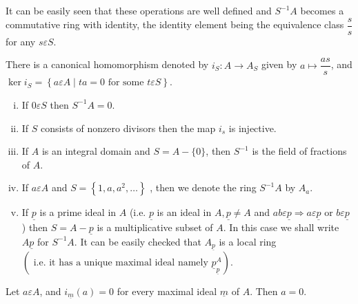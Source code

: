 It can be easily seen that these operations are well defined and
$S^{-1}A$ becomes a commutative ring with identity, the identity
element being the equivalence class $\dfrac{s}{s}$ for any
$s\varepsilon S$.

There is a canonical homomorphism denoted by $i_S:A\rightarrow A_S$
given by $a\mapsto \dfrac{as}{s}$, and $\ker i_S=\left\{a\varepsilon A \mid ta=0
\text{ for some }t\varepsilon S\right\}$.

\begin{Rem}\label{c1:Rem5.1}
\begin{enumerate}[(i)]
\item If $0\varepsilon S$ then $S^{-1}A=0$.

\item If $S$ consists of nonzero divisors then the map $i_s$ is
  injective.

\item If $A$ is an integral domain and $S=A-\{0\}$, then $S^{-1}$ is
  the field of fractions of $A$. 

\item If $a\varepsilon A$ and $S=\left\{1,a,a^{2},\ldots\right\}$ ,
  then we denote the ring $S^{-1}A$ by $A_a$.
\item If $\underline{p}$ is a prime ideal in $A$ (i.e. $\underline{p}$ is an ideal in $A,\underline{p}\neq
  A$ and $ab\varepsilon \underline{p} \Rightarrow a \varepsilon \underline{p}$ or
  $b\varepsilon \underline{p}$) then $S=A-\underline{p}$ is a multiplicative subset of $A$. In
  this case we shall write $A\underline{p}$ for $S^{-1}A$. It can be easily
  checked that $A_{\underline{p}}$ is a local ring $\left(\text{ i.e. it has a unique maximal
  ideal namely }\underline{p}^{A}_{\underline{p}}\right)$.
\end{enumerate}
\end{Rem}


\begin{lem}\label{c1:lem5.2}
Let $a\varepsilon A$, and $i_{\underline{m}}(a)=0$ for every maximal
ideal $\underline{m}$ of $A$.  Then $a=0$.
\end{lem}


